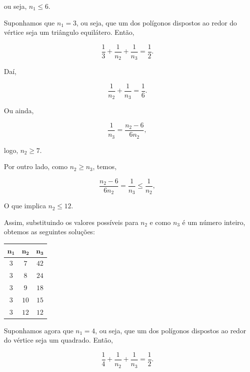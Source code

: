 ou seja, $n_1\leq6$.

Suponhamos que $n_1=3$, ou seja, que um dos polígonos dispostos ao redor do vértice seja um triângulo equilátero. Então,

\begin{equation*}
\frac{1}{3}+\frac{1}{n_2}+\frac{1}{n_3}=\frac{1}{2}.
\end{equation*}

Daí,

\begin{equation*}
\frac{1}{n_2}+\frac{1}{n_3}=\frac{1}{6}.
\end{equation*}

Ou ainda,

\begin{equation*}
\frac{1}{n_3}=\frac{n_2-6}{6n_2},
\end{equation*}

logo, $n_2\geq7$.

Por outro lado, como $n_2\geq n_3$, temos,

\begin{equation*}
\frac{n_2-6}{6n_2}=\frac{1}{n_3}\leq\frac{1}{n_2},
\end{equation*}

O que implica $n_2\leq12$.

Assim, substituindo os valores possíveis para $n_2$ e como $n_3$ é um número inteiro, obtemos as seguintes soluções:



\begin{table}[H]
\centering
\setlength\tabcolsep{5mm}
\begin{tabu} to \textwidth{|c|c|c|}
\hline
$\bm{n_1}$ & $\bm{n_2}$ & $\bm{n_3}$ \\
\hline
$3$ & $7$ & $42$ \\
\hline
$3$ & $8$ & $24$ \\
\hline
$3$ & $9$ & $18$ \\
\hline
$3$ & $10$ & $15$ \\
\hline
$3$ & $12$ & $12$ \\
\hline
\end{tabu}
\end{table}

Suponhamos agora que $n_1=4$, ou seja, que um dos polígonos dispostos ao redor do vértice seja um quadrado. Então,

\begin{equation*}
\frac{1}{4}+\frac{1}{n_2}+\frac{1}{n_3}=\frac{1}{2}.
\end{equation*}


